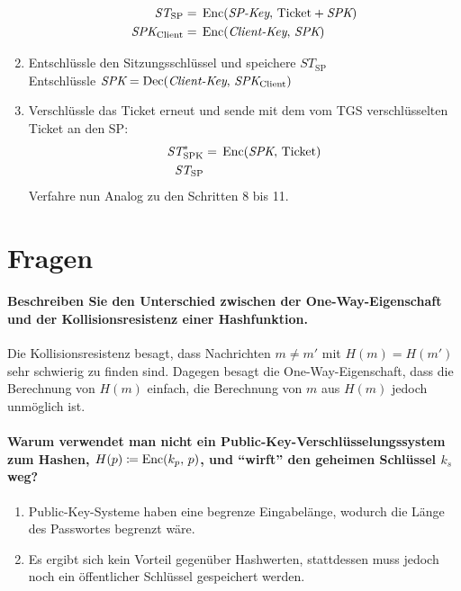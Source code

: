 \begin{enumerate}
				\begin{align*}
					\textit{ST}_\textrm{SP}      & =\, \operatorname{Enc}(\textit{SP-Key},\, \textrm{Ticket}+\textit{SPK}) \\
					\textit{SPK}_\textrm{Client} & =\, \operatorname{Enc}(\textit{Client-Key},\, \textit{SPK})
				\end{align*}
			\item Entschlüssle den Sitzungsschlüssel und speichere \( \textit{ST}_\textrm{SP} \) \\ Entschlüssle \( \textit{SPK} = \operatorname{Dec}(\textit{Client-Key},\, \textit{SPK}_\textrm{Client}) \)
			\item Verschlüssle das Ticket erneut und sende mit dem vom TGS verschlüsselten Ticket an den SP:
				\begin{align*}
					\textit{ST}^*_\textrm{SPK} & =\, \operatorname{Enc}(\textit{SPK},\, \textrm{Ticket}) \\
					\textit{ST}_\textrm{SP}    &
				\end{align*}
				Verfahre nun Analog zu den Schritten 8 bis 11.
		\end{enumerate}

\section{Fragen} %
\paragraph{Beschreiben Sie den Unterschied zwischen der One-Way-Eigenschaft und der Kollisionsresistenz einer Hashfunktion.}
Die Kollisionsresistenz besagt, dass Nachrichten \( m \neq m' \) mit \( H(m) = H(m') \) sehr schwierig zu finden sind. Dagegen besagt die One-Way-Eigenschaft, dass die Berechnung von \( H(m) \) einfach, die Berechnung von \(m\) aus \(H(m)\) jedoch unmöglich ist.

\paragraph{Warum verwendet man nicht ein Public-Key-Verschlüsselungssystem zum Hashen, \(H(p) \coloneqq \operatorname{Enc}(k_p,\, p) \), und \enquote{wirft} den geheimen Schlüssel \(k_s\) weg?}
\begin{enumerate}
	\item Public-Key-Systeme haben eine begrenze Eingabelänge, wodurch die Länge des Passwortes begrenzt wäre.
	\item Es ergibt sich kein Vorteil gegenüber Hashwerten, stattdessen muss jedoch noch ein öffentlicher Schlüssel gespeichert werden.
\end{enumerate}

